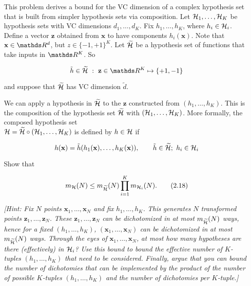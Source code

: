 \def\tildeH{\widetilde \hipotset}


\begin{enunciado}{19}
    This problem derives a bound for the VC dimension of a complex hypothesis set that is built from simpler hypothesis sets via composition. Let $\mathcal{H}_1, \dots, \mathcal{H}_K$ be hypothesis sets with VC dimensions $d_1, \dots, d_K$. Fix $h_1, \dots, h_K$, where $h_i \in \mathcal{H}_i$. Define a vector $\mathbf{z}$ obtained from $\mathbf{x}$ to have components $h_i(\mathbf{x})$. Note that $\mathbf{x} \in \conjR^d$, but $z \in \{-1, +1\}^K$. 
    Let $\tildeH$ be a hypothesis set of functions that take inputs in $\conjR^K$. So
    
    $$ \tilde h \in \tildeH ~:~ \mathbf{z} \in \conjR^K \mapsto \{ +1, -1 \} $$
    
    and suppose that $\widetilde {\mathcal{H}}$ has VC dimension $\tilde d$.
    
    We can apply a hypothesis in $\tildeH$ to the $\mathbf{z}$ constructed from $(h_1, \dots, h_K)$. This is the composition of the hypothesis set $\tildeH$ with $(\mathcal{H}_1, \dots, \mathcal{H}_K)$. 
    More formally, the composed hypothesis set\\
    $\hipotset = \tildeH \circ (\hipotset_1, \dots, \hipotset_K)$ is defined by $h \in \mathcal{H}$ if
    
    $$ h(\mathbf{x}) = \tilde h (h_1(\mathbf{x}), \dots, h_K(\mathbf{x})), \qquad \tilde h \in \tildeH;~h_i \in \hipotset_i $$
    
     Show that 
    
    \begin{equation}
    m_{\hipotset}(N) \le m_{\tildeH}(N) \prod\limits_{i=1}^K m_{\hipotset_i}(N). \tag{2.18}
    \end{equation}
    
    \textit{[Hint: Fix $N$ points $\mathbf{x}_1, \dots, \mathbf{x}_N$ and fix $h_1, \dots, h_K$. This generates $N$ transformed points $\mathbf{z}_1, \dots, \mathbf{z}_N$. These $\mathbf{z}_1, \dots, \mathbf{z}_N$ can be dichotomized in at most $m_{\tildeH}(N)$ ways, hence for a fixed $(h_1, \dots, h_K)$, $(\mathbf{x}_1, \dots, \mathbf{x}_N)$ can be dichotomized in at most $m_{\tildeH}(N)$ ways. Through the eyes of $\mathbf{x}_1, \dots, \mathbf{x}_N$, at most how many hypotheses are there (effectively) in $\mathcal{H}_i$? 
    Use this bound to bound the effective number of $K$-tuples $(h_1, \dots, h_K)$ that need to be considered. Finally, argue that you can bound the number of dichotomies that can be implemented by the product of the number of possible $K$-tuples $(h_1, \dots, h_K)$ and the number of dichotomies per $K$-tuple.]}
    

\end{enunciado}

